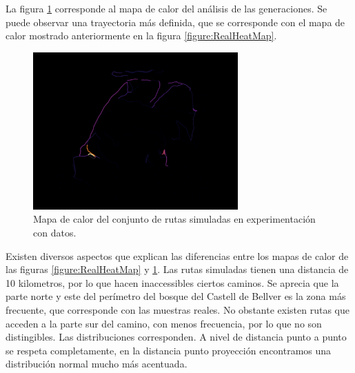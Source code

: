 La figura \ref{figure:SimulatedHeatMap} corresponde al mapa de calor del análisis de las generaciones. Se puede observar una trayectoria más definida, que se corresponde con el mapa de calor mostrado 
anteriormente en la figura \ref{figure:RealHeatMap}.
\begin{figure}[!htb]
\begin{center}
\includegraphics[width=0.7\textwidth]{./Imagenes/SimulatedHeatMap1.png}
\caption{Mapa de calor del conjunto de rutas simuladas en experimentación con datos.}
\label{figure:SimulatedHeatMap}
\end{center}
\end{figure}
Existen diversos aspectos que explican las diferencias entre los mapas de calor de las figuras \ref{figure:RealHeatMap} y \ref{figure:SimulatedHeatMap}. Las rutas simuladas tienen una distancia de 
10 kilometros, por lo que hacen inaccessibles ciertos caminos. Se aprecia que la parte norte y este del 
perímetro del bosque del Castell de Bellver es la zona más frecuente, que corresponde con las muestras 
reales. No obstante existen rutas que acceden a la parte sur del camino, con menos frecuencia, por lo 
que no son distingibles.
Las distribuciones corresponden. A nivel de distancia punto a punto se respeta completamente, en la 
distancia punto proyección encontramos una distribución normal mucho más acentuada.

